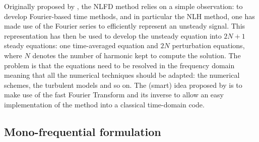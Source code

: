 
Originally proposed by \citet{McMullen2001}, the NLFD
method relies on a simple observation: 
to develop Fourier-based time methods, and in
particular the NLH method, one has made use of the Fourier
series to efficiently represent an unsteady signal.
This representation has then be used to develop the unsteady
equation into $2N+1$ steady equations: one time-averaged equation
and $2N$ perturbation equations, 
where $N$ denotes the number
of harmonic kept to compute the solution.
The problem is that the equations need to be 
resolved in the frequency domain meaning
that all the numerical techniques should be adapted: the numerical schemes,
the turbulent models and so on. The (smart) idea 
proposed by \citet{McMullen2001} is to
make use of the fast Fourier Transform and its inverse to
allow an easy implementation of the method into a classical time-domain code.

\subsection{Mono-frequential formulation}

